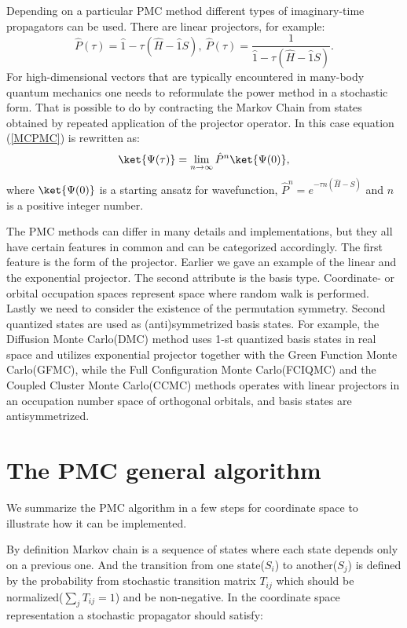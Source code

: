 \documentclass[twoside,english]{uiofysmaster}
\begin{document}
Depending on a particular PMC method different types of imaginary-time propagators can be used. There are linear projectors, for example:
\[
\hat{P}(\tau)= \hat{1} - \tau (\hat{H} - \hat{1}S),\ 
\hat{P}(\tau)= \frac {1}{\hat{1} - \tau (\hat{H} - \hat{1}S)}.
\]
For high-dimensional vectors that are typically encountered in many-body quantum mechanics one needs to reformulate the power method in a stochastic form. That is possible to do by contracting the Markov Chain from states obtained by repeated application of the projector operator. In this case equation (\ref{MCPMC}) is rewritten as:
\begin{equation}\label{MCPMC1}
\ket{\Psi(\tau)}= \lim_{n\to\infty} \hat{P}^n \ket{\Psi(0)}, 
\end{equation}
where $\ket{\Psi(0)}$ is a starting ansatz for wavefunction, $\hat{P}^n = e^{-\tau n(\hat{H} - S)}$ and $n$ is a positive integer number.

The PMC methods can differ in many details and implementations, but they all have certain features in common and can be categorized accordingly. The first feature is the form of the projector. Earlier we gave an example of the linear and the exponential projector. The second attribute is the basis type. Coordinate- or orbital occupation spaces represent space where random walk is performed. Lastly we need to consider the existence of the permutation symmetry. Second quantized states are used as (anti)symmetrized basis states. For example, the Diffusion Monte Carlo(DMC) method uses 1-st quantized basis states in real space and utilizes exponential projector together with the Green Function Monte Carlo(GFMC), while the Full Configuration Monte Carlo(FCIQMC)\cite{BoothApproachingchemicalaccuracy2010} \cite{BoothFermionMonteCarlo2009} and the Coupled Cluster Monte Carlo(CCMC)\cite{SpencerDevelopmentsstochasticcoupled2016} \cite{ThomStochasticCoupledCluster2010} methods operates with linear projectors in an occupation number space of orthogonal orbitals, and basis states are antisymmetrized.

\section{The PMC general algorithm}
We summarize the PMC algorithm in a few steps for coordinate space to illustrate how it can be implemented.

By definition Markov chain is a sequence of states where each state depends only on a previous one. And the transition from one state($S_i$) to another($S_j$) is defined by the probability from stochastic transition matrix $T_{ij}$ which should be normalized($\sum_jT_{ij}=1$) and be non-negative.
In the coordinate space representation a stochastic propagator should satisfy:
\end{document}
